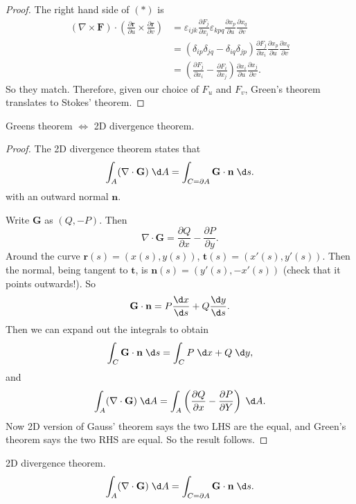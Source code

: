 \documentclass[a4paper]{article}
\begin{document}
\begin{proof}
  The right hand side of $(*)$ is
  \begin{align*}
    (\nabla \times \mathbf{F})\cdot \left(\frac{\partial \mathbf{r}}{\partial u}\times \frac{\partial \mathbf{r}}{\partial v}\right) &= \varepsilon_{ijk}\frac{\partial F_j}{\partial x_i}\varepsilon_{kpq}\frac{\partial x_p}{\partial u}\frac{\partial x_q}{\partial v}\\
    &= (\delta_{ip}\delta_{jq} - \delta_{iq}\delta_{jp}) \frac{\partial F_j}{\partial x_i}\frac{\partial x_p}{\partial u}\frac{\partial x_q}{\partial v}\\
    &= \left(\frac{\partial F_j}{\partial x_i} - \frac{\partial F_i}{\partial x_j}\right)\frac{\partial x_i}{\partial u}\frac{\partial x_j}{\partial v}.
  \end{align*}
  So they match. Therefore, given our choice of $F_u$ and $F_v$, Green's theorem translates to Stokes' theorem.
\end{proof}


\begin{prop}
  Greens theorem $\Leftrightarrow$ 2D divergence theorem.
\end{prop}

\begin{proof}
  The 2D divergence theorem states that
  \[
    \int_A (\nabla\cdot \mathbf{G})\;\d A = \int_{C = \partial A} \mathbf{G}\cdot \mathbf{n}\;\d s.
  \]
  with an outward normal $\mathbf{n}$.

  Write $\mathbf{G}$ as $(Q, -P)$. Then
  \[
    \nabla\cdot \mathbf{G} = \frac{\partial Q}{\partial x} - \frac{\partial P}{\partial y}.
  \]
  Around the curve $\mathbf{r}(s) = (x(s), y(s))$, $\mathbf{t}(s) = (x'(s), y'(s))$. Then the normal, being tangent to $\mathbf{t}$, is $\mathbf{n}(s) = (y'(s), -x'(s))$ (check that it points outwards!). So
  \[
    \mathbf{G}\cdot \mathbf{n} = P\frac{\d x}{\d s} + Q\frac{\d y}{\d s}.
  \]
  Then we can expand out the integrals to obtain
  \[
    \int_C \mathbf{G}\cdot \mathbf{n}\;\d s = \int_C P\;\d x + Q\;\d y,
  \]
  and
  \[
    \int_A(\nabla\cdot \mathbf{G})\;\d A = \int_A\left(\frac{\partial Q}{\partial x} - \frac{\partial P}{\partial Y}\right)\;\d A.
  \]
  Now 2D version of Gauss' theorem says the two LHS are the equal, and Green's theorem says the two RHS are equal. So the result follows.
\end{proof}

\begin{prop}
  2D divergence theorem.
  \[
    \int_A (\nabla\cdot \mathbf{G})\;\d A = \int_{C = \partial A} \mathbf{G}\cdot \mathbf{n}\;\d s.
  \]
\end{prop}
\end{document}
